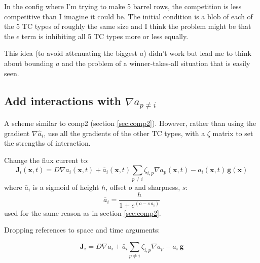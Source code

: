 \documentclass[11pt, a4paper]{article}
\newcommand{\mb}[1]{\mathbf{#1}} %
\begin{document}
In the config where I'm trying to make 5 barrel rows, the competition
is less competitive than I imagine it could be. The initial condition
is a blob of each of the 5 TC types of roughly the same size and I
think the problem might be that the $\epsilon$ term is inhibiting all
5 TC types more or less equally.

This idea (to avoid attenuating the biggest $a$) didn't work but lead
me to think about bounding $a$ and the problem of a winner-takes-all
situation that is easily seen.

\subsection{Add interactions with $\nabla {a}_{{p}\ne{i}}$}
\label{sec:comp6}

A scheme similar to comp2 (section \ref{sec:comp2}). However, rather
than using the gradient $\nabla \hat{a}_i$, use all the gradients of
the other TC types, with a $\zeta$ matrix to set the strengths of
interaction.

Change the flux current to:
%
\begin{equation} \label{eq:J_NM_with_comp6}
\mb{J}_i(\mb{x},t) = D \nabla a_i(\mb{x},t)
+ \bar{a}_i(\mb{x}, t)  \sum_{p \ne i}  \zeta_{i,p} \nabla {a}_p(\mb{x}, t) -
a_i(\mb{x}, t) \, \mb{g}(\mb{x})
\end{equation}
%
where $\bar{a}_i$ is a sigmoid of height $h$, offset $o$ and
sharpness, $s$:
\begin{equation}
\bar{a}_i = \frac{h}{1 + e^{(o - s \, a_i)}}
\end{equation}
%
used for the same reason as in section \ref{sec:comp2}.

Dropping references to space and time arguments:

\begin{equation} \label{eq:J_NM_with_comp6_noargs}
\mb{J}_i = D \nabla a_i + \bar{a}_i \sum_{p \ne i} \zeta_{i,p} \nabla {a}_p - a_i \, \mb{g}
\end{equation}
\end{document}
